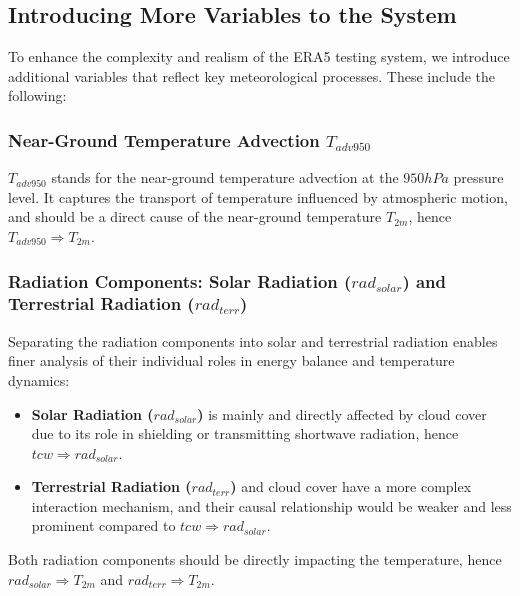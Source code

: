 \subsection{Introducing More Variables to the System}
\label{appsec:era5_moreV}

To enhance the complexity and realism of the ERA5 testing system, we introduce additional variables that reflect key meteorological processes. These include the following: 

\subsubsection{Near-Ground Temperature Advection $T_{adv950}$ }

$T_{adv950}$ stands for the near-ground temperature advection at the $950 hPa$ pressure level. It captures the transport of temperature influenced by atmospheric motion, and should be a direct cause of the near-ground temperature $T_{2m}$, hence $T_{adv950} \Rightarrow T_{2m}$.

\subsubsection{Radiation Components: Solar Radiation ($rad_{solar}$) and Terrestrial Radiation ($rad_{terr}$)}

Separating the radiation components into solar and terrestrial radiation enables finer analysis of their individual roles in energy balance and temperature dynamics:
\begin{itemize}
    \item \textbf{Solar Radiation ($rad_{solar}$)} is mainly and directly affected by cloud cover due to its role in shielding or transmitting shortwave radiation, hence $tcw\Rightarrow rad_{solar}$.
    \item \textbf{Terrestrial Radiation ($rad_{terr}$)} and cloud cover have a more complex interaction mechanism, and their causal relationship would be weaker and less prominent compared to $tcw\Rightarrow rad_{solar}$.
\end{itemize}
Both radiation components should be directly impacting the temperature, hence $rad_{solar} \Rightarrow T_{2m}$ and $rad_{terr} \Rightarrow T_{2m}$.

